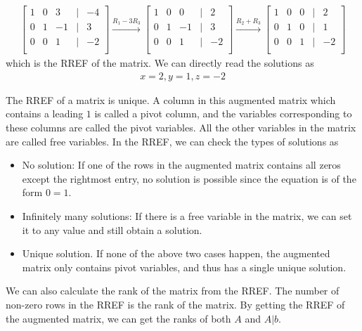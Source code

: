 \documentclass[../../linear_algebra.tex]{subfiles}
\begin{document}
\begin{gather*}
    \begin{bmatrix}
    1 &0 &3 &\vert &-4\\
    0 &1 &-1 &\vert &3\\
    0 &0 &1 &\vert &-2\\
    \end{bmatrix} \overset{R_{1} - 3R_{3}}\rightarrow
    \begin{bmatrix}
    1 &0 &0 &\vert &2\\
    0 &1 &-1 &\vert &3\\
    0 &0 &1 &\vert &-2\\
    \end{bmatrix} \overset{R_{2} + R_{3}}\rightarrow
    \begin{bmatrix}
    1 &0 &0 &\vert &2\\
    0 &1 &0 &\vert &1\\
    0 &0 &1 &\vert &-2\\
    \end{bmatrix}
\end{gather*}
which is the RREF of the matrix. We can directly read the solutions as
\begin{align*}
    x = 2, y = 1, z = -2
\end{align*}

The RREF of a matrix is unique. A column in this augmented matrix which contains a leading $1$ is called a pivot column, and the variables corresponding to these columns are called the pivot variables. All the other variables in the matrix are called free variables. In the RREF, we can check the types of solutions as
\begin{itemize}
    \item No solution: If one of the rows in the augmented matrix contains all zeros except the rightmost entry, no solution is possible since the equation is of the form $0 = 1$.
    \item Infinitely many solutions: If there is a free variable in the matrix, we can set it to any value and still obtain a solution.
    \item Unique solution. If none of the above two cases happen, the augmented matrix only contains pivot variables, and thus has a single unique solution.
\end{itemize}

We can also calculate the rank of the matrix from the RREF. The number of non-zero rows in the RREF is the rank of the matrix. By getting the RREF of the augmented matrix, we can get the ranks of both $A$ and $A\vert b$.
\end{document}
